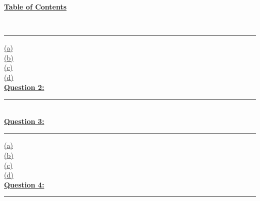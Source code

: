 \documentclass[12pt]{article}
\begin{document}
\begin{center}
    \hypertarget{toc}{\LARGE \noindent \underline{\textbf{Table of Contents}}}\\
\end{center}

\vspace{1mm}
\hrule
\vspace{1mm}
\noindent
\hyperlink{1.1}{(a)}\\
\hyperlink{1.2}{(b)}\\
\hyperlink{1.3}{(c)}\\
\hyperlink{1.4}{(d)}\\

\noindent \hyperlink{2}{\textbf{Question 2:}}
\vspace{1mm}
\hrule
\vspace{1mm} \leavevmode \\

\noindent \hyperlink{3}{\textbf{Question 3:}}
\vspace{1mm}
\hrule
\vspace{1mm}
\noindent
\hyperlink{3.1}{(a)}\\
\hyperlink{3.2}{(b)}\\
\hyperlink{3.3}{(c)}\\
\hyperlink{3.4}{(d)}\\

\noindent \hyperlink{4}{\textbf{Question 4:}}
\vspace{1mm}
\hrule
\vspace{1mm} \leavevmode \\

\newpage
\end{document}
